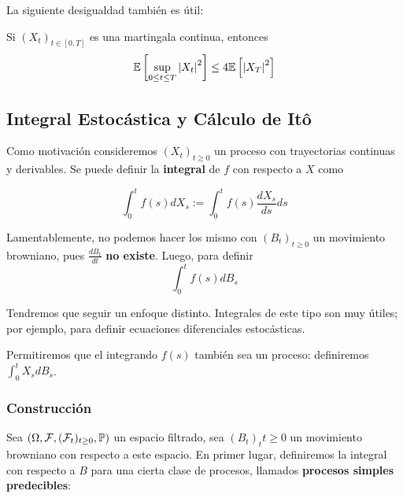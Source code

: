 \newp La siguiente desigualdad también es útil:
\begin{theorem}
    Si $(X_t)_{t \in [0,T]}$ es una martingala continua, entonces 
    \begin{equation*}
            \E \left[ \sup_{0 \le  t \le  T} \abs{X_t}^2 \right] \le 4 \E \left[ \abs{X_T}^2 \right]
    \end{equation*}
        
\end{theorem}

\subsection{Integral Estocástica y Cálculo de It\^{o}}

Como motivación consideremos $(X_t)_{t \ge 0}$ un proceso con trayectorias continuas y derivables. 
Se puede definir la \textbf{integral} de $f$ con respecto a $X$ como

\begin{equation*}
        \int_{0}^{t} f(s) dX_s := \int_{0}^{t} f(s) \frac{dX_s}{ds} ds 
\end{equation*}

Lamentablemente, no podemos hacer los mismo con $(B_t)_{t \ge 0}$ un movimiento browniano, pues 
$\frac{dB_t}{dt}$ \textbf{no existe}. Luego, para definir 
\begin{equation*}
        \int_{0}^{t} f(s) dB_s
\end{equation*}

Tendremos que seguir un enfoque distinto. Integrales de este tipo son muy útiles; por ejemplo, 
para definir ecuaciones diferenciales estocásticas. 

\begin{remark}
        Permitiremos que el integrando $f(s)$ también sea un proceso: definiremos $\int_{0}^{t} X_s dB_s$. 
\end{remark}

\subsubsection{Construcción}

Sea $(\Omega, \mathcal{F}, (\mathcal{F}_t)_{t \geq 0}, \P)$ un espacio filtrado, sea $(B_t)_t{t \ge 0}$ un 
movimiento browniano con respecto a este espacio. En primer lugar, definiremos
la integral con respecto a $B$ para una cierta clase de procesos, llamados \textbf{procesos simples 
predecibles}:

